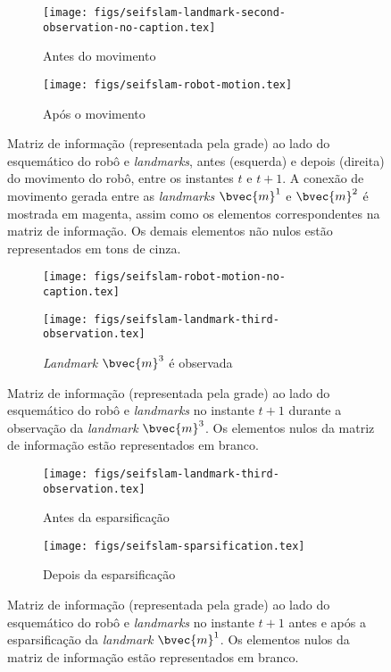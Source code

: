 \begin{figure}[h]
  \begin{subfigure}{0.475\textwidth}
    \texttt{[image: figs/seifslam-landmark-second-observation-no-caption.tex]}
    \caption{Antes do movimento}
  \end{subfigure}
  \hfill
  \begin{subfigure}{0.475\textwidth}
    \texttt{[image: figs/seifslam-robot-motion.tex]} 
    \caption{Após o movimento}
    \label{fig:seifslam-info-matrix-construction-motion-b}
  \end{subfigure}
  \caption{Matriz de informação (representada pela grade) ao lado do esquemático do robô e \textit{landmarks}, antes (esquerda) e depois (direita) do movimento do robô, entre os instantes $t$ e $t+1$. A conexão de movimento gerada entre as \textit{landmarks} $\bvec{m}^1$ e $\bvec{m}^2$ é mostrada em magenta, assim como os elementos correspondentes na matriz de informação. Os demais elementos não nulos estão representados em tons de cinza.}
  \label{fig:seifslam-info-matrix-construction-motion}
\end{figure}

\begin{figure}[h]
  \begin{subfigure}{0.475\textwidth}
    \texttt{[image: figs/seifslam-robot-motion-no-caption.tex]} 
    \caption{}
  \end{subfigure}
  \hfill
  \begin{subfigure}{0.475\textwidth}
    \texttt{[image: figs/seifslam-landmark-third-observation.tex]}
    \caption{\textit{Landmark} $\bvec{m}^3$ é observada}
    \label{fig:seifslam-info-matrix-construction-third-observation-b}
  \end{subfigure}
  \caption{Matriz de informação (representada pela grade) ao lado do esquemático do robô e \textit{landmarks} no instante $t+1$ durante a observação da \textit{landmark} $\bvec{m}^3$. Os elementos nulos da matriz de informação estão representados em branco.}
  \label{fig:seifslam-info-matrix-construction-third-observation}
\end{figure}

\begin{figure}[h]
  \begin{subfigure}{0.475\textwidth}
    \texttt{[image: figs/seifslam-landmark-third-observation.tex]}
    \caption{Antes da esparsificação}
  \end{subfigure}
  \hfill
  \begin{subfigure}{0.475\textwidth}
    \texttt{[image: figs/seifslam-sparsification.tex]} 
    \caption{Depois da esparsificação}
  \end{subfigure}
  \caption{Matriz de informação (representada pela grade) ao lado do esquemático do robô e \textit{landmarks} no instante $t+1$ antes e após a esparsificação da \textit{landmark} $\bvec{m}^1$. Os elementos nulos da matriz de informação estão representados em branco.}
  \label{fig:seifslam-info-matrix-sparsification}
\end{figure}

